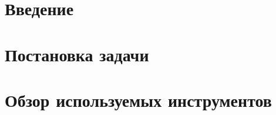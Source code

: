 




\usepackage{totcount}

\usepackage{caption}
\usepackage{listings}




\maketitle
\setcounter{tocdepth}{2}
\tableofcontents


\section*{Введение}


\section{Постановка задачи}


% 

\section{Обзор используемых инструментов}






